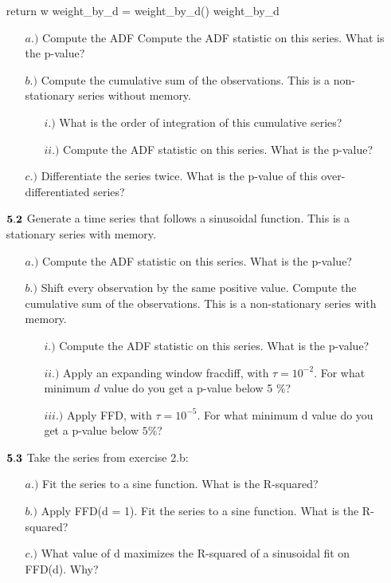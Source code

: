 \documentclass{letter}
\begin{document}
\begin{itemize}
    return w
weight_by_d = weight_by_d()
weight_by_d   
     

\begin{itemize}
\item[$a.)$] Compute the ADF Compute the ADF statistic on this series. What is the p-value?
\item[$b.)$] Compute the cumulative sum of the observations. This is a non-stationary
series without memory.
\begin{itemize}
\item[$i.)$] What is the order of integration of this cumulative series?
\item[$ii.)$] Compute the ADF statistic on this series. What is the p-value?
\end{itemize}
\item[$c.)$] Differentiate the series twice. What is the p-value of this over-differentiated
series?
\end{itemize}

\item[${\bf 5.2}$] Generate a time series that follows a sinusoidal function. This is a stationary
series with memory.
\begin{itemize}
\item[$a.)$] Compute the ADF statistic on this series. What is the p-value?
\item[$b.)$] Shift every observation by the same positive value. Compute the cumulative
sum of the observations. This is a non-stationary series with memory.
\begin{itemize}
\item[$i.)$] Compute the ADF statistic on this series. What is the p-value?
\item[$ii.)$] Apply an expanding window fracdiff, with $\tau = 10^{-2}$. 
For what minimum $d$ value do you get a p-value below 5 \%?
\item[$iii.)$] Apply FFD, with $\tau = 10^{-5}$. For what minimum d value do 
you get a p-value below $5\%$?
\end{itemize}
\end{itemize}

\item[${\bf 5.3}$] Take the series from exercise 2.b:
\begin{itemize}
\item[$a.)$] Fit the series to a sine function. What is the R-squared?
\item[$b.)$] Apply FFD(d = 1). Fit the series to a sine function. What is the R-squared?
\item[$c.)$] What value of d maximizes the R-squared of a sinusoidal fit on FFD(d).
Why?
\end{itemize}


\end{itemize}
\end{document}
